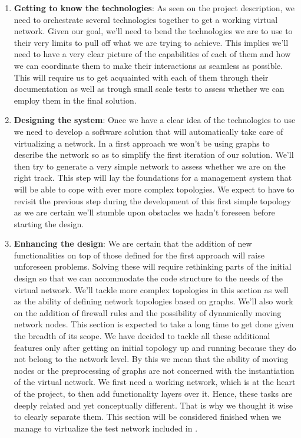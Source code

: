 \documentclass[12pt]{article}
\begin{document}
        \begin{enumerate}
            \item \textbf{Getting to know the technologies}: As seen on the project description, we need to orchestrate several technologies together to get a working virtual network. Given our goal, we'll need to bend the technologies we are to use to their very limits to pull off what we are trying to achieve. This implies we'll need to have a very clear picture of the capabilities of each of them and how we can coordinate them to make their interactions as seamless as possible. This will require us to get acquainted with each of them through their documentation as well as trough small scale tests to assess whether we can employ them in the final solution.

            \item \textbf{Designing the system}: Once we have a clear idea of the technologies to use we need to develop a software solution that will automatically take care of virtualizing a network. In a first approach we won't be using graphs to describe the network so as to simplify the first iteration of our solution. We'll then try to generate a very simple network to assess whether we are on the right track. This step will lay the foundations for a management system that will be able to cope with ever more complex topologies. We expect to have to revisit the previous step during the development of this first simple topology as we are certain we'll stumble upon obstacles we hadn't foreseen before starting the design.

            \item \textbf{Enhancing the design}: We are certain that the addition of new functionalities on top of those defined for the first approach will raise unforeseen problems. Solving these will require rethinking parts of the initial design so that we can accommodate the code structure to the needs of the virtual network. We'll tackle more complex topologies in this section as well as the ability of defining network topologies based on graphs. We'll also work on the addition of firewall rules and the possibility of dynamically moving network nodes. This section is expected to take a long time to get done given the breadth of its scope. We have decided to tackle all these additional features only after getting an initial topology up and running because they do not belong to the network level. By this we mean that the ability of moving nodes or the preprocessing of graphs are not concerned with the instantiation of the virtual network. We first need a working network, which is at the heart of the project, to then add functionality layers over it. Hence, these tasks are deeply related and yet conceptually different. That is why we thought it wise to clearly separate them. This section will be considered finished when we manage to virtualize the test network included in \cite{bib:ICS}.


\end{enumerate}
\end{document}
